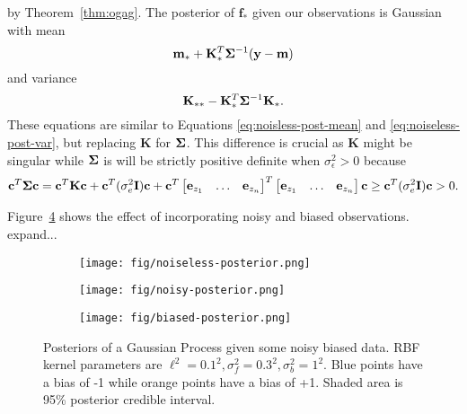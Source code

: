 by Theorem~\ref{thm:ogag}.
The posterior of $\mathbf{f}_*$ given our observations is Gaussian with mean
\begin{equation*}
    \mathbf{m}_* + \mathbf{K}_*^T \boldsymbol{\Sigma}^{-1} (\mathbf{y} - \mathbf{m})
\end{equation*}
and variance
\begin{equation*}
    \mathbf{K}_{* *} - \mathbf{K}_*^T \boldsymbol{\Sigma}^{-1} \mathbf{K}_*.
\end{equation*}
These equations are similar to Equations \ref{eq:noisless-post-mean} and \ref{eq:noiseless-post-var},
but replacing $\mathbf{K}$ for $\boldsymbol{\Sigma}$.
This difference is crucial as $\mathbf{K}$ might be singular
while $\boldsymbol{\Sigma}$ is will be strictly positive definite when $\sigma_{\epsilon}^2 > 0$ because
\begin{align*}
    \mathbf{c}^{T} \boldsymbol{\Sigma} \mathbf{c}
    = \mathbf{c}^{T} \mathbf{K} \mathbf{c}
    + \mathbf{c}^{T} (\sigma^2_e \mathbf{I}) \mathbf{c} 
    +
    \mathbf{c}^{T}
    \begin{bmatrix}
        \mathbf{e}_{z_1} & \hdots & \mathbf{e}_{z_n}
    \end{bmatrix}^{ T}
     \begin{bmatrix}
        \mathbf{e}_{z_1} & \hdots & \mathbf{e}_{z_n}
    \end{bmatrix}
    \mathbf{c} \geq \mathbf{c}^{T} (\sigma^2_e \mathbf{I}) \mathbf{c}
    > 0.
\end{align*}


Figure~\ref{fig:gp-posteriors} shows the effect of incorporating noisy and biased observations.
expand...

\begin{figure}
    \centering
    \begin{subfigure}[b]{0.3\textwidth}
        \centering
        \texttt{[image: fig/noiseless-posterior.png]}
        \caption{}
        \label{subfig:noiseless-post}
    \end{subfigure}
    \hfill
    \begin{subfigure}[b]{0.3\textwidth}
        \centering
        \texttt{[image: fig/noisy-posterior.png]}
        \caption{}
        \label{subfig:noisy-posterior}
    \end{subfigure}
    \hfill
    \begin{subfigure}[b]{0.3\textwidth}
        \centering
        \texttt{[image: fig/biased-posterior.png]}
        \caption{}
        \label{subfig:biased-posterior}
    \end{subfigure}
    \hfill
    \caption{Posteriors of a Gaussian Process given some noisy biased data.
        RBF kernel parameters are $\ell^{2} = 0.1^2, \sigma^2_{f} = 0.3 ^ 2, \sigma^2_b = 1^2$.
        Blue points have a bias of -1 while orange points have a bias of +1.
        Shaded area is 95\% posterior credible interval.
    }
    \label{fig:gp-posteriors}
\end{figure}
